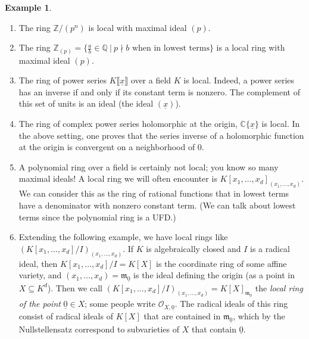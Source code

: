 \documentclass{amsart}[12pt]
\newcommand{\vx}{\underline{x}}
\newcommand{\Q}{\mathbb{Q}}
\newcommand{\CC}{\mathbb{C}}
\newcommand{\Z}{\mathbb{Z}}
\newcommand{\ZZ}{\mathbb{Z}}
\newcommand{\m}{{\mathfrak m}}
\numberwithin{equation}{section}
\theoremstyle{plain} %
\theoremstyle{definition}
\newtheorem{example}[equation]{Example}
\theoremstyle{remark}
\begin{document}
\begin{example}
	\begin{enumerate}
		\item The ring $\ZZ/(p^n)$ is local with maximal ideal $(p)$.
		\item The ring $\Z_{(p)} = \{ \frac{a}{b} \in \Q \ | \ p\nmid b \text{ when in lowest terms}\}$ is a local ring with maximal ideal $(p)$.
		\item The ring of power series $K\llbracket \vx \rrbracket$ over a field $K$ is local. Indeed, a power series has an inverse if and only if its constant term is nonzero. The complement of this set of units is an ideal (the ideal $(\vx)$).
		\item The ring of complex power series holomorphic at the origin, $\CC\{ \vx \}$ is local. In the above setting, one proves that the series inverse of a holomorphic function at the origin is convergent on a neighborhood of $0$.
		\item A polynomial ring over a field is certainly not local; you know so many maximal ideals! A local ring we will often encounter is $K[x_1,\dots,x_d]_{(x_1,\dots,x_d)}$. We can consider this as the ring of rational functions that in lowest terms have a denominator with nonzero constant term. (We can talk about lowest terms since the polynomial ring is a UFD.)
		\item Extending the following example, we have local rings like $(K[x_1,\dots,x_d]/I)_{(x_1,\dots,x_d)}$. If $K$ is algebraically closed and $I$ is a radical ideal, then $K[x_1,\dots,x_d]/I= K[X]$ is the coordinate ring of some affine variety, and $(x_1,\dots,x_d)=\m_{\underline{0}}$ is the ideal defining the origin (as a point in $X \subseteq K^d$). Then we call $(K[x_1,\dots,x_d]/I)_{(x_1,\dots,x_d)}=K[X]_{\m_{\underline{0}}}$ the \emph{local ring of the point} $\underline{0} \in X$; some people write $\mathcal{O}_{X,\underline{0}}$. The radical ideals of this ring consist of radical ideals of $K[X]$ that are contained in $\m_{\underline{0}}$, which by the Nullstellensatz correspond to subvarieties of $X$ that contain $\underline{0}$.
	\end{enumerate}
\end{example}

\end{document}
